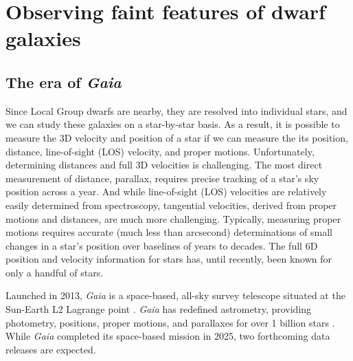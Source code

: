 \section{Observing faint features of dwarf
galaxies}\label{observing-faint-features-of-dwarf-galaxies}

\subsection{\texorpdfstring{The era of
\emph{Gaia}}{The era of Gaia}}\label{the-era-of-gaia}

Since Local Group dwarfs are nearby, they are resolved into individual
stars, and we can study these galaxies on a star-by-star basis. As a
result, it is possible to measure the 3D velocity and position of a star
if we can measure the its position, distance, line-of-sight (LOS)
velocity, and proper motions. Unfortunately, determining distances and
full 3D velocities is challenging. The most direct measurement of
distance, parallax, requires precise tracking of a star's sky position
across a year. And while line-of-sight (LOS) velocities are relatively
easily determined from spectroscopy, tangential velocities, derived from
proper motions and distances, are much more challenging. Typically,
measuring proper motions requires accurate (much less than arcsecond)
determinations of small changes in a star's position over baselines of
years to decades. The full 6D position and velocity information for
stars has, until recently, been known for only a handful of stars.

Launched in 2013, \emph{Gaia} is a space-based, all-sky survey telescope
situated at the Sun-Earth L2 Lagrange point
\citep{gaiacollaboration+2016}. \emph{Gaia} has redefined astrometry,
providing photometry, positions, proper motions, and parallaxes for over
1 billion stars \citep{gaiacollaboration+2021}. While \emph{Gaia}
completed its space-based mission in 2025, two forthcoming data releases
are expected.

